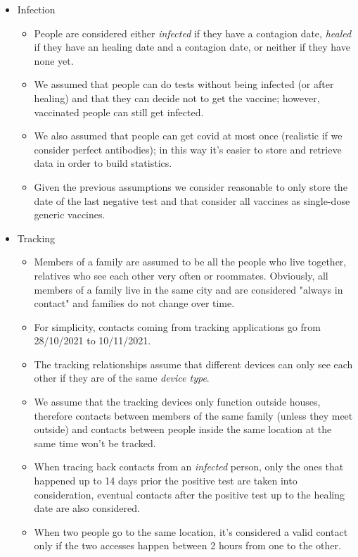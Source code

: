 \documentclass[12pt, a4paper]{article}
\begin{document}
\begin{itemize}

    \item Infection
    \begin{itemize}
        \item[] People are considered either \emph{infected} if they have a 
            contagion date, \emph{healed} if they have an healing date and a 
            contagion date, or neither if they have none yet.
        \item[] We assumed that people can do tests without being infected 
            (or after healing) and that they can decide not to get the vaccine;
            however, vaccinated people can still get infected.
        \item[] We also assumed that people can get covid at most once 
            (realistic if we consider perfect antibodies); in this way it's 
            easier to store and retrieve data in order to build statistics.
        \item[] Given the previous assumptions we consider reasonable to only
            store the date of the last negative test and that consider all 
            vaccines as single-dose generic vaccines.
    \end{itemize}

    \item Tracking
    \begin{itemize}
        \item[] Members of a family are assumed to be all the people who live 
            together, relatives who see each other very often or roommates. 
            Obviously, all members of a family live in the same city and are 
            considered "always in contact" and families do not change over time.
        \item[] For simplicity, contacts coming from tracking applications go 
            from \\ 28/10/2021 to 10/11/2021.
        \item[] The tracking relationships assume that different devices can 
            only see each other if they are of the same \emph{device type}.
        \item[] We assume that the tracking devices only function outside 
            houses, therefore contacts between members of the same family 
            (unless they meet outside) and contacts between people inside the
            same location at the same time won't be tracked.
        \item[] When tracing back contacts from an \emph{infected} person, only
            the ones that happened up to 14 days prior the positive test are 
            taken into consideration, eventual contacts after the positive 
            test up to the healing date are also considered.
        \item[] When two people go to the same location, it's considered a
            valid contact only if the two accesses happen between 2 hours from
            one to the other.
    \end{itemize}


\end{itemize}
\end{document}
